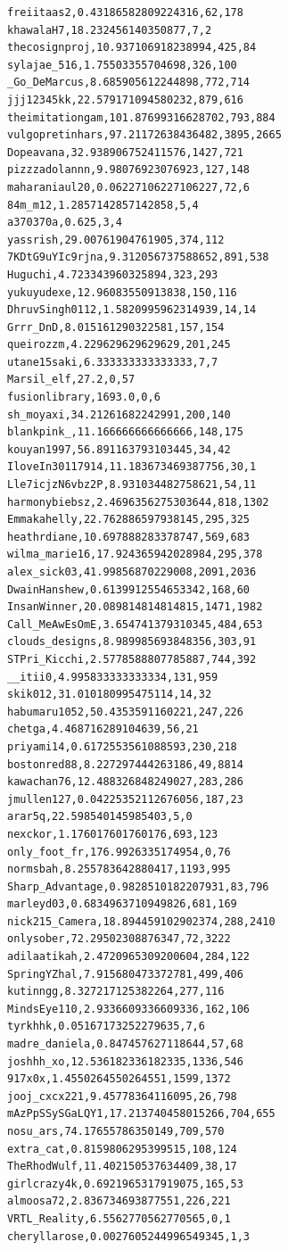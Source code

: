 \begin{verbatim}
freiitaas2,0.43186582809224316,62,178
khawalaH7,18.232456140350877,7,2
thecosignproj,10.937106918238994,425,84
sylajae_516,1.75503355704698,326,100
_Go_DeMarcus,8.685905612244898,772,714
jjj12345kk,22.579171094580232,879,616
theimitationgam,101.87699316628702,793,884
vulgopretinhars,97.21172638436482,3895,2665
Dopeavana,32.938906752411576,1427,721
pizzzadolannn,9.98076923076923,127,148
maharaniaul20,0.06227106227106227,72,6
84m_m12,1.2857142857142858,5,4
a370370a,0.625,3,4
yassrish,29.00761904761905,374,112
7KDtG9uYIc9rjna,9.312056737588652,891,538
Huguchi,4.723343960325894,323,293
yukuyudexe,12.96083550913838,150,116
DhruvSingh0112,1.5820995962314939,14,14
Grrr_DnD,8.015161290322581,157,154
queirozzm,4.229629629629629,201,245
utane15saki,6.333333333333333,7,7
Marsil_elf,27.2,0,57
fusionlibrary,1693.0,0,6
sh_moyaxi,34.21261682242991,200,140
blankpink_,11.166666666666666,148,175
kouyan1997,56.891163793103445,34,42
IloveIn30117914,11.183673469387756,30,1
Lle7icjzN6vbz2P,8.931034482758621,54,11
harmonybiebsz,2.4696356275303644,818,1302
Emmakahelly,22.762886597938145,295,325
heathrdiane,10.697888283378747,569,683
wilma_marie16,17.924365942028984,295,378
alex_sick03,41.99856870229008,2091,2036
DwainHanshew,0.6139912554653342,168,60
InsanWinner,20.089814814814815,1471,1982
Call_MeAwEsOmE,3.654741379310345,484,653
clouds_designs,8.989985693848356,303,91
STPri_Kicchi,2.5778588807785887,744,392
__itii0,4.995833333333334,131,959
skik012,31.010180995475114,14,32
habumaru1052,50.4353591160221,247,226
chetga,4.468716289104639,56,21
priyami14,0.6172553561088593,230,218
bostonred88,8.227297444263186,49,8814
kawachan76,12.488326848249027,283,286
jmullen127,0.04225352112676056,187,23
arar5q,22.598540145985403,5,0
nexckor,1.176017601760176,693,123
only_foot_fr,176.9926335174954,0,76
normsbah,8.255783642880417,1193,995
Sharp_Advantage,0.9828510182207931,83,796
marleyd03,0.6834963710949826,681,169
nick215_Camera,18.894459102902374,288,2410
onlysober,72.29502308876347,72,3222
adilaatikah,2.4720965309200604,284,122
SpringYZhal,7.915680473372781,499,406
kutinngg,8.327217125382264,277,116
MindsEye110,2.9336609336609336,162,106
tyrkhhk,0.05167173252279635,7,6
madre_daniela,0.847457627118644,57,68
joshhh_xo,12.536182336182335,1336,546
917x0x,1.4550264550264551,1599,1372
jooj_cxcx221,9.45778364116095,26,798
mAzPpSSySGaLQY1,17.213740458015266,704,655
nosu_ars,74.17655786350149,709,570
extra_cat,0.8159806295399515,108,124
TheRhodWulf,11.402150537634409,38,17
girlcrazy4k,0.6921965317919075,165,53
almoosa72,2.836734693877551,226,221
VRTL_Reality,6.5562770562770565,0,1
cheryllarose,0.0027605244996549345,1,3

\end{verbatim}

